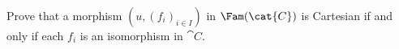 \begin{exercise}
Prove that a morphism \(\left(u,\left(f_i\right)_{i \in I}\right)\) in \(\Fam(\cat{C})\) is Cartesian if and only if each \(f_i\) is an isomorphism in \(\cat{C}\).
\end{exercise}